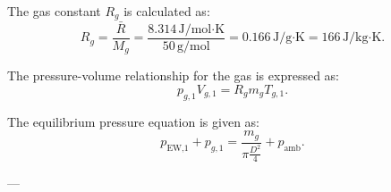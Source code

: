 The gas constant \( R_g \) is calculated as:  
\[
R_g = \frac{\bar{R}}{M_g} = \frac{8.314 \, \text{J/mol·K}}{50 \, \text{g/mol}} = 0.166 \, \text{J/g·K} = 166 \, \text{J/kg·K}.
\]

The pressure-volume relationship for the gas is expressed as:  
\[
p_{g,1} V_{g,1} = R_g m_g T_{g,1}.
\]

The equilibrium pressure equation is given as:  
\[
p_{\text{EW,1}} + p_{g,1} = \frac{m_g}{\pi \frac{D^2}{4}} + p_{\text{amb}}.
\]

---